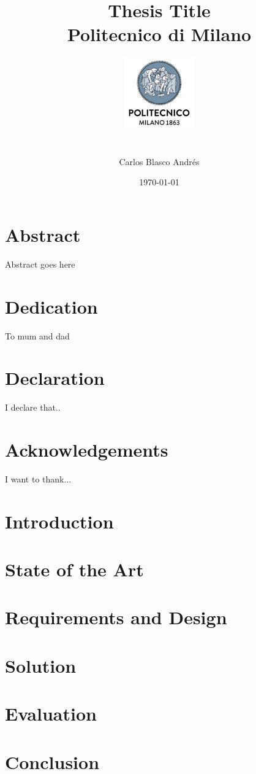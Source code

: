 \documentclass[12pt,twoside]{book}
\title{
{Thesis Title}\\
{\large Politecnico di Milano}\\
{\includegraphics[width=3cm, height=4cm]{university.png}}
}
\author{Carlos Blasco Andrés}
\date{\today}
\begin{document}
\maketitle

\chapter*{Abstract}
Abstract goes here

\chapter*{Dedication}
To mum and dad

\chapter*{Declaration}
I declare that..

\chapter*{Acknowledgements}
I want to thank...

\tableofcontents
\listoftables
\listoffigures

\chapter{Introduction}


\chapter{State of the Art}


\chapter{Requirements and Design}


\chapter{Solution}


\chapter{Evaluation}


\chapter{Conclusion}



\end{document}
